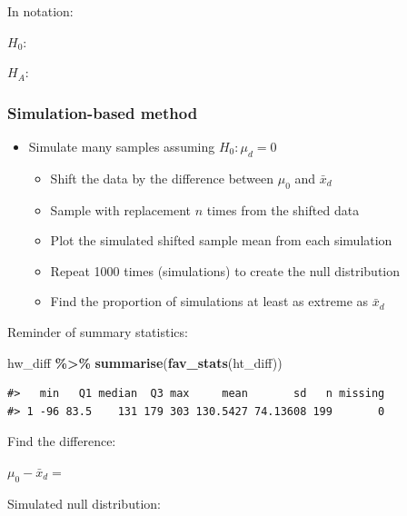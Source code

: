 \documentclass[
]{report}
\newenvironment{Shaded}{\begin{snugshade}}{\end{snugshade}}
\newcommand{\FunctionTok}[1]{\textcolor[rgb]{0.13,0.29,0.53}{\textbf{#1}}}
\newcommand{\NormalTok}[1]{#1}
\newcommand{\SpecialCharTok}[1]{\textcolor[rgb]{0.81,0.36,0.00}{\textbf{#1}}}
\begin{document}
In notation:

\(H_0:\)

\vspace{0.2in}

\(H_A:\)

\vspace{0.2in}

\subsubsection*{Simulation-based method}\label{simulation-based-method-6}

\begin{itemize}
\item
  Simulate many samples assuming \(H_0: \mu_d = 0\)

  \begin{itemize}
  \item
    Shift the data by the difference between \(\mu_0\) and \(\bar{x}_d\)
  \item
    Sample with replacement \(n\) times from the shifted data
  \item
    Plot the simulated shifted sample mean from each simulation
  \item
    Repeat 1000 times (simulations) to create the null distribution
  \item
    Find the proportion of simulations at least as extreme as \(\bar{x}_d\)
  \end{itemize}
\end{itemize}

Reminder of summary statistics:

\begin{Shaded}
\begin{Highlighting}[]
\NormalTok{hw\_diff }\SpecialCharTok{\%\textgreater{}\%}
    \FunctionTok{summarise}\NormalTok{(}\FunctionTok{fav\_stats}\NormalTok{(ht\_diff))}
\end{Highlighting}
\end{Shaded}

\begin{verbatim}
#>   min   Q1 median  Q3 max     mean       sd   n missing
#> 1 -96 83.5    131 179 303 130.5427 74.13608 199       0
\end{verbatim}

Find the difference:

\(\mu_0 - \bar{x}_d =\)

Simulated null distribution:
\end{document}
